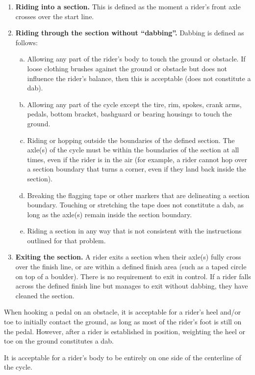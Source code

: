 \begin{enumerate}
\item \textbf{Riding into a section.} This is defined as the moment a rider's front axle crosses over the start line.
\item \textbf{Riding through the section without ``dabbing''.} Dabbing is defined as follows:
	\begin{enumerate}[a.]
	\item Allowing any part of the rider's body to touch the ground or obstacle. 
	If loose clothing brushes against the ground or obstacle but does not influence the rider's balance, then this is acceptable (does not constitute a dab).
	\item Allowing any part of the cycle except the tire, rim, spokes, crank arms, pedals, bottom bracket, bashguard or bearing housings to touch the ground.
	\item Riding or hopping outside the boundaries of the defined section.
	The axle(s) of the cycle must be within the boundaries of the section at all times, even if the rider is in the air (for example, a rider cannot hop over a section boundary that turns a corner, even if they land back inside the section).
	\item Breaking the flagging tape or other markers that are delineating a section boundary. 
	Touching or stretching the tape does not constitute a dab, as long as the axle(s) remain inside the section boundary.
	\item Riding a section in any way that is not consistent with the instructions outlined for that problem.
	\end{enumerate}
\item \textbf{Exiting the section.} A rider exits a section when their axle(s) fully cross over the finish line, or are within a
defined finish area (such as a taped circle on top of a boulder). 
There is no requirement to exit in control.
If a rider falls across the defined finish line but manages to exit without dabbing, they have cleaned the section.
\end{enumerate}

When hooking a pedal on an obstacle, it is acceptable for a rider's heel and/or toe to initially contact the ground, as long
as most of the rider's foot is still on the pedal. 
However, after a rider is established in position, weighting the heel or toe on the ground constitutes a dab.

It is acceptable for a rider's body to be entirely on one side of the centerline of the cycle.

